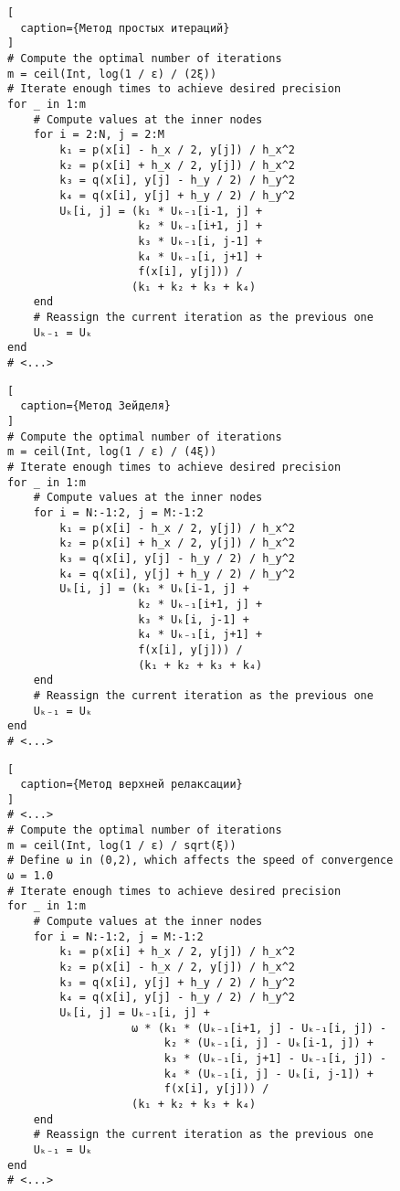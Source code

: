 \begin{figure}[h!]
\begin{lstlisting}[
  caption={Метод простых итераций}
]
# Compute the optimal number of iterations
m = ceil(Int, log(1 / ε) / (2ξ))
# Iterate enough times to achieve desired precision
for _ in 1:m
    # Compute values at the inner nodes
    for i = 2:N, j = 2:M
        k₁ = p(x[i] - h_x / 2, y[j]) / h_x^2
        k₂ = p(x[i] + h_x / 2, y[j]) / h_x^2
        k₃ = q(x[i], y[j] - h_y / 2) / h_y^2
        k₄ = q(x[i], y[j] + h_y / 2) / h_y^2
        Uₖ[i, j] = (k₁ * Uₖ₋₁[i-1, j] +
                    k₂ * Uₖ₋₁[i+1, j] +
                    k₃ * Uₖ₋₁[i, j-1] +
                    k₄ * Uₖ₋₁[i, j+1] +
                    f(x[i], y[j])) /
                   (k₁ + k₂ + k₃ + k₄)
    end
    # Reassign the current iteration as the previous one
    Uₖ₋₁ = Uₖ
end
# <...>
\end{lstlisting}
\end{figure}

\newpage

\begin{figure}[h!]
\begin{lstlisting}[
  caption={Метод Зейделя}
]
# Compute the optimal number of iterations
m = ceil(Int, log(1 / ε) / (4ξ))
# Iterate enough times to achieve desired precision
for _ in 1:m
    # Compute values at the inner nodes
    for i = N:-1:2, j = M:-1:2
        k₁ = p(x[i] - h_x / 2, y[j]) / h_x^2
        k₂ = p(x[i] + h_x / 2, y[j]) / h_x^2
        k₃ = q(x[i], y[j] - h_y / 2) / h_y^2
        k₄ = q(x[i], y[j] + h_y / 2) / h_y^2
        Uₖ[i, j] = (k₁ * Uₖ[i-1, j] +
                    k₂ * Uₖ₋₁[i+1, j] +
                    k₃ * Uₖ[i, j-1] +
                    k₄ * Uₖ₋₁[i, j+1] +
                    f(x[i], y[j])) /
                    (k₁ + k₂ + k₃ + k₄)
    end
    # Reassign the current iteration as the previous one
    Uₖ₋₁ = Uₖ
end
# <...>
\end{lstlisting}
\end{figure}

\newpage

\begin{figure}[h]
\begin{lstlisting}[
  caption={Метод верхней релаксации}
]
# <...>
# Compute the optimal number of iterations
m = ceil(Int, log(1 / ε) / sqrt(ξ))
# Define ω in (0,2), which affects the speed of convergence
ω = 1.0
# Iterate enough times to achieve desired precision
for _ in 1:m
    # Compute values at the inner nodes
    for i = N:-1:2, j = M:-1:2
        k₁ = p(x[i] + h_x / 2, y[j]) / h_x^2
        k₂ = p(x[i] - h_x / 2, y[j]) / h_x^2
        k₃ = q(x[i], y[j] + h_y / 2) / h_y^2
        k₄ = q(x[i], y[j] - h_y / 2) / h_y^2
        Uₖ[i, j] = Uₖ₋₁[i, j] +
                   ω * (k₁ * (Uₖ₋₁[i+1, j] - Uₖ₋₁[i, j]) -
                        k₂ * (Uₖ₋₁[i, j] - Uₖ[i-1, j]) +
                        k₃ * (Uₖ₋₁[i, j+1] - Uₖ₋₁[i, j]) -
                        k₄ * (Uₖ₋₁[i, j] - Uₖ[i, j-1]) +
                        f(x[i], y[j])) /
                   (k₁ + k₂ + k₃ + k₄)
    end
    # Reassign the current iteration as the previous one
    Uₖ₋₁ = Uₖ
end
# <...>
\end{lstlisting}
\end{figure}

